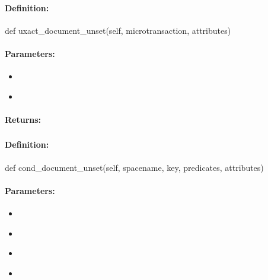 \paragraph{Definition:}
\begin{pythoncode}
def uxact_document_unset(self, microtransaction, attributes)
\end{pythoncode}

\paragraph{Parameters:}
\begin{itemize}[noitemsep]
\item {}\\

\item {}\\

\end{itemize}

\paragraph{Returns:}


\pagebreak
\subsubsection{}
\label{api:python:cond_document_unset}


\paragraph{Definition:}
\begin{pythoncode}
def cond_document_unset(self, spacename, key, predicates, attributes)
\end{pythoncode}

\paragraph{Parameters:}
\begin{itemize}[noitemsep]
\item {}\\

\item {}\\

\item {}\\

\item {}\\

\end{itemize}

